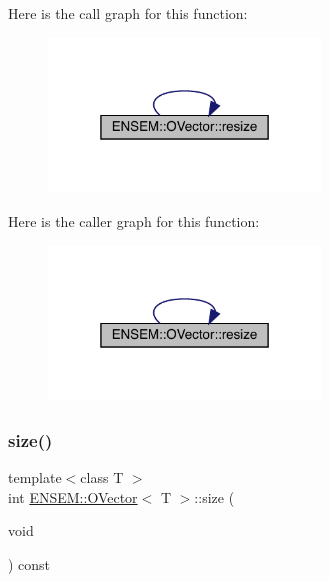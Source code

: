 Here is the call graph for this function\+:
\nopagebreak
\begin{figure}[H]
\begin{center}
\leavevmode
\includegraphics[width=205pt]{d0/d8d/classENSEM_1_1OVector_a64fa4ad4d58dd32268c2bea8be1de212_cgraph}
\end{center}
\end{figure}
Here is the caller graph for this function\+:
\nopagebreak
\begin{figure}[H]
\begin{center}
\leavevmode
\includegraphics[width=205pt]{d0/d8d/classENSEM_1_1OVector_a64fa4ad4d58dd32268c2bea8be1de212_icgraph}
\end{center}
\end{figure}
\mbox{\label{classENSEM_1_1OVector_a715979c319905eb60532815bb3c77aab}} 
\subsubsection{\texorpdfstring{size()}{size()}\hspace{0.1cm}{\footnotesize\ttfamily [1/3]}}
{\footnotesize\ttfamily template$<$class T $>$ \\
int \mbox{\hyperlink{classENSEM_1_1OVector}{E\+N\+S\+E\+M\+::\+O\+Vector}}$<$ T $>$\+::size (\begin{DoxyParamCaption}\item[{void}]{ }\end{DoxyParamCaption}) const\hspace{0.3cm}{\ttfamily [inline]}}



